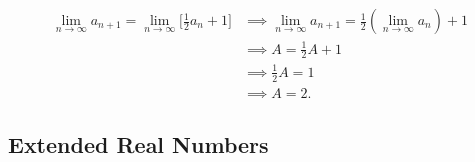 \documentclass[a4paper]{article}
\begin{document}
\begin{eg}
\begin{enumerate}
        \begin{align*}
            \lim_{ n \to \infty  }  {a}_{n+1} = \lim_{ n \to \infty  }  \Big[ \frac{ 1 }{ 2 }  {a}_{n} + 1\Big] &\implies \lim_{ n \to \infty  }  {a}_{n+1} = \frac{ 1 }{ 2 }  (\lim_{ n \to \infty  }  {a}_{n}) + 1 \\
                                                                                                                &\implies A = \frac{ 1 }{ 2 } A + 1 \\
                                                                                                                &\implies \frac{ 1 }{ 2 } A = 1 \\
                                                                                                                &\implies A = 2.
        \end{align*}
   \end{enumerate}
\end{eg}

\subsection{Extended Real Numbers}
\end{document}
